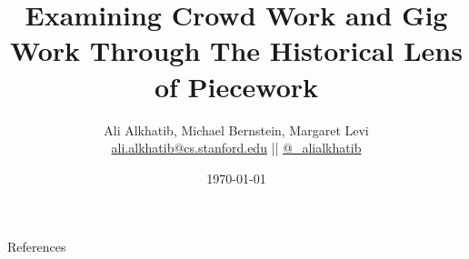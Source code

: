 \documentclass[aspectratio=169,12pt,noslidenumbers]{beamer} %
\title{Examining Crowd Work and Gig Work Through The Historical Lens of Piecework}
\author{{Ali Alkhatib}, Michael Bernstein, Margaret Levi\\
\href{mailto:ali.alkhatib@cs.stanford.edu}{ali.alkhatib@cs.stanford.edu} ||
         \href{http://twitter.com/_alialkhatib}{@\_alialkhatib}}
\institute[Stanford]{Stanford University}
\date{\today}
\newcommand{\onlyinsubfile}[1]{#1}
\newcommand{\notinsubfile}[1]{}
\begin{document}
\renewcommand{\onlyinsubfile}[1]{}
\renewcommand{\notinsubfile}[1]{#1}

\begin{frame}
\titlepage
\end{frame}









\begin{frame}[allowframebreaks]{References}
  \printbibliography{}
\end{frame}
\end{document}
